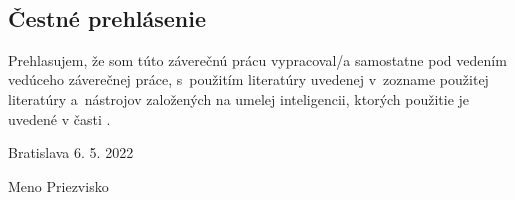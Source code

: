 
\
\vfill

\subsection*{Čestné prehlásenie}

Prehlasujem, že som túto záverečnú prácu vypracoval/a samostatne pod vedením vedúceho záverečnej práce, s~použitím literatúry uvedenej v~zozname použitej literatúry a~nástrojov založených na umelej inteligencii, ktorých použitie je uvedené v časti .

\vspace{10pt}

\noindent Bratislava 6. 5. 2022 \hfil
\newline

\begin{flushright}
	Meno Priezvisko $\qquad$
\end{flushright}
